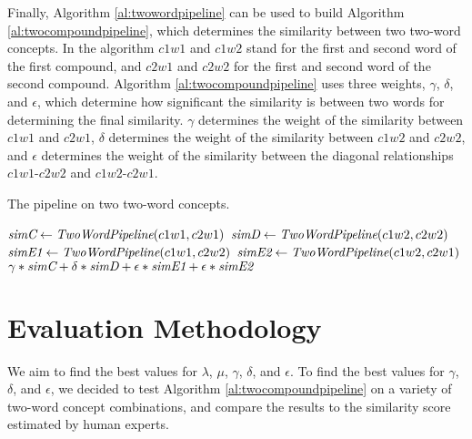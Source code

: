 \documentclass{article}
\begin{document}
Finally, Algorithm \ref{al:twowordpipeline} can be used to build Algorithm \ref{al:twocompoundpipeline}, which determines the similarity between two two-word concepts. In the algorithm $c1w1$ and $c1w2$ stand for the first and second word of the first compound, and $c2w1$ and $c2w2$ for the first and second word of the second compound. Algorithm \ref{al:twocompoundpipeline} uses three weights, $\gamma$, $\delta$, and $\epsilon$, which determine how significant the similarity is between two words for determining the final similarity. $\gamma$ determines the weight of the similarity between $c1w1$ and $c2w1$, $\delta$ determines the weight of the similarity between $c1w2$ and $c2w2$, and $\epsilon$ determines the weight of the similarity between the diagonal relationships $c1w1$-$c2w2$ and $c1w2$-$c2w1$.

\begin{algorithm}
\caption{The pipeline on two two-word concepts.}\label{al:twocompoundpipeline}
\begin{algorithmic}[1]
		\State $\emph{simC} \gets \emph{TwoWordPipeline}(c1w1, c2w1)$
		\State $\emph{simD} \gets \emph{TwoWordPipeline}(c1w2, c2w2)$
		\State $\emph{simE1} \gets \emph{TwoWordPipeline}(c1w1, c2w2)$
		\State $\emph{simE2} \gets \emph{TwoWordPipeline}(c1w2, c2w1)$
		\State \Return $\gamma * \emph{simC} + \delta * \emph{simD} + \epsilon * \emph{simE1} + \epsilon * \emph{simE2}$
	\EndProcedure
\end{algorithmic}
\end{algorithm}

\section{Evaluation Methodology} \label{sec:evalmeth}

We aim to find the best values for $\lambda$, $\mu$, $\gamma$, $\delta$, and $\epsilon$. To find the best values for $\gamma$, $\delta$, and $\epsilon$, we decided to test Algorithm \ref{al:twocompoundpipeline} on a variety of two-word concept combinations, and compare the results to the similarity score estimated by human experts.
\end{document}
